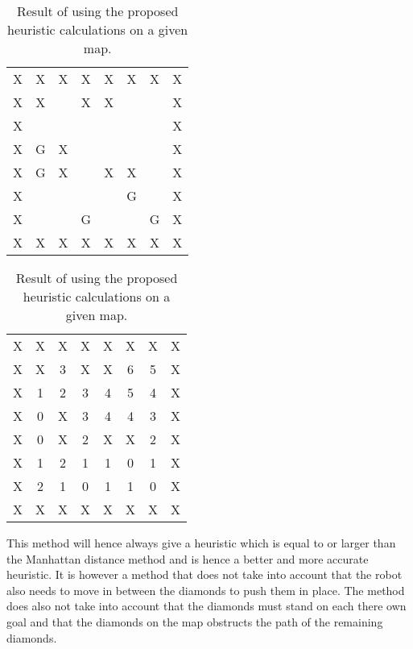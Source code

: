 \begin{table}[H]
\begin{subtable}{.5\linewidth}
\centering
\begin{tabular}{| *{8}{c} |}
\hline
X & X & X & X & X & X & X & X \\
X & X &   & X & X &   &   & X \\
X &   &   &   &   &   &   & X \\
X & G & X &   &   &   &   & X \\
X & G & X &   & X & X &   & X \\
X &   &   &   &   & G &   & X \\
X &   &   & G &   &   & G & X \\
X & X & X & X & X & X & X & X \\
\hline
\end{tabular}
\caption{Original test map.}
\label{fig:orig_testmap}
\end{subtable}
%
\begin{subtable}{.5\linewidth}
\centering
\begin{tabular}{| *{8}{c} |}
\hline
X & X & X & X & X & X & X & X \\
X & X & 3 & X & X & 6 & 5 & X \\
X & 1 & 2 & 3 & 4 & 5 & 4 & X \\
X & 0 & X & 3 & 4 & 4 & 3 & X \\
X & 0 & X & 2 & X & X & 2 & X \\
X & 1 & 2 & 1 & 1 & 0 & 1 & X \\
X & 2 & 1 & 0 & 1 & 1 & 0 & X \\
X & X & X & X & X & X & X & X \\
\hline
\end{tabular}
\caption{Cost test map.}
\label{fig:orig_costmap}
\end{subtable}
\caption{Result of using the proposed heuristic calculations on a given map.}
\end{table}

This method will hence always give a heuristic which is equal to or larger than the Manhattan distance method and is hence a better and more accurate heuristic.
It is however a method that does not take into account that the robot also needs to move in between the diamonds to push them in place.
The method does also not take into account that the diamonds must stand on each there own goal and that the diamonds on the map obstructs the path of the remaining diamonds.